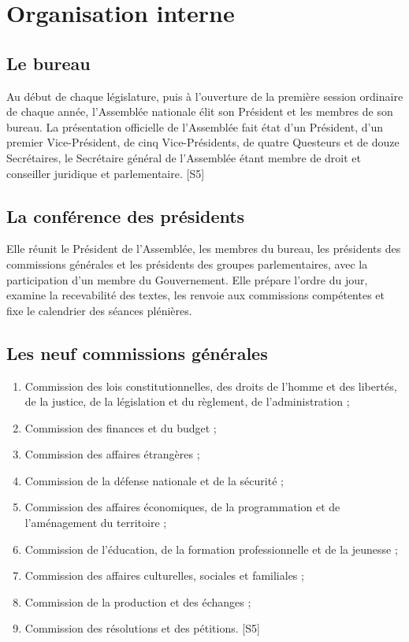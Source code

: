 \documentclass[11pt,a4paper,oneside]{report}
\newcommand{\src}[1]{\textcolor{bluec}{\scriptsize[#1]}}
\begin{document}
\section{Organisation interne}
\subsection{Le bureau}
Au début de chaque législature, puis à l'ouverture de la première session ordinaire de chaque année, l'Assemblée nationale élit son Président et les membres de son bureau. La présentation officielle de l'Assemblée fait état d'un Président, d'un premier Vice-Président, de cinq Vice-Présidents, de quatre Questeurs et de douze Secrétaires, le Secrétaire général de l'Assemblée étant membre de droit et conseiller juridique et parlementaire. \src{S5}

\subsection{La conférence des présidents}
Elle réunit le Président de l'Assemblée, les membres du bureau, les présidents des commissions générales et les présidents des groupes parlementaires, avec la participation d'un membre du Gouvernement. Elle prépare l'ordre du jour, examine la recevabilité des textes, les renvoie aux commissions compétentes et fixe le calendrier des séances plénières.

\subsection{Les neuf commissions générales}
\begin{enumerate}
  \item Commission des lois constitutionnelles, des droits de l'homme et des libertés, de la justice, de la législation et du règlement, de l'administration ;
  \item Commission des finances et du budget ;
  \item Commission des affaires étrangères ;
  \item Commission de la défense nationale et de la sécurité ;
  \item Commission des affaires économiques, de la programmation et de l'aménagement du territoire ;
  \item Commission de l'éducation, de la formation professionnelle et de la jeunesse ;
  \item Commission des affaires culturelles, sociales et familiales ;
  \item Commission de la production et des échanges ;
  \item Commission des résolutions et des pétitions. \src{S5}
\end{enumerate}
\end{document}
